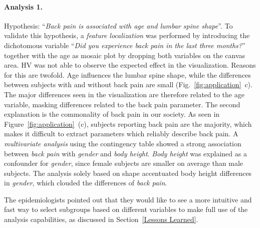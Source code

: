 \documentclass[journal]{style/vgtc} 			          %
\begin{document}
\paragraph{Analysis 1.}
Hypothesis: ``\emph{Back pain is associated with age and lumbar spine shape}''.
%
To validate this hypothesis, a \emph{feature localization} was performed by introducing the dichotomous variable ``\emph{Did you experience back pain in the last three months?}'' together with the age as mosaic plot by dropping both variables on the canvas area.
%
HV was not able to observe the expected effect in the visualization.
%
Reasons for this are twofold.
%
Age influences the lumbar spine shape, while the differences between subjects with and without back pain are small (Fig.~\ref{fig:application}~c).
%
The major differences seen in the visualization are therefore related to the age variable, masking differences related to the back pain parameter.
%
The second explanation is the commonality of back pain in our society.
%
As seen in Figure~\ref{fig:application}~(c), subjects reporting back pain are the majority, which makes it difficult to extract parameters which reliably describe back pain.
%
A \emph{multivariate analysis} using the contingency table showed a strong association between \emph{back pain} with \emph{gender} and \emph{body height}.
%
\emph{Body height} was explained as a confounder for \emph{gender}, since female subjects are smaller on average than male subjects.
%
The analysis solely based on shape accentuated body height differences in \emph{gender}, which clouded the differences of \emph{back pain}.
%

The epidemiologists pointed out that they would like to see a more intuitive and fast way to select subgroups based on different variables to make full use of the analysis capabilities, as discussed in Section~\ref{Lessons Learned}.
\end{document}
